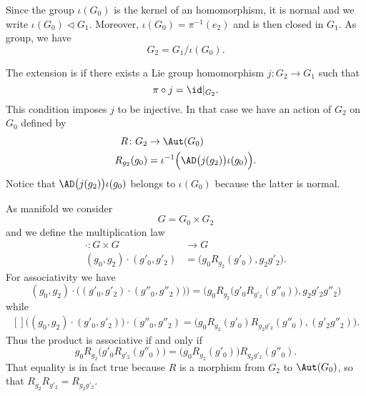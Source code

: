 Since the group $\iota(G_0)$ is the kernel of an homomorphism, it is normal and we write $\iota(G_0)\lhd G_1$. Moreover, $\iota(G_0)=\pi^{-1}(e_2)$ and is then closed in $G_1$. As group, we have
\begin{equation}
	G_2=G_1/\iota(G_0).
\end{equation}

The extension is  if there exists a Lie group homomorphism  $j\colon G_2\to G_1$ such that
\begin{equation}
	\pi\circ j=\id|_{G_2}.
\end{equation}
This condition imposes $j$ to be injective. In that case we have an action of $G_2$ on $G_0$ defined by
\begin{equation}
	\begin{aligned}
		R\colon G_2  & \to \Aut(G_0)                                           \\
		R_{g_2}(g_0) & =\iota^{-1}\Big( \AD\big( j(g_2) \big)\iota(g_0) \Big).
	\end{aligned}
\end{equation}
Notice that $\AD\big(j(g_2)\big)\iota(g_0)$ belongs to $\iota(G_0)$ because the latter is normal.

As manifold we consider
\begin{equation}
	G=G_0\times G_2
\end{equation}
and we define the multiplication law
\begin{equation}
	\begin{aligned}
		\cdot\colon G\times G     & \to G                                   \\
		(g_0,g_2)\cdot(g'_0,g'_2) & =\big( g_0 R_{g_2}(g'_0),g_2g'_2 \big).
	\end{aligned}
\end{equation}
For associativity we have
\begin{equation}
	(g_0,g_2)\cdot\big( (g'_0,g'_2)\cdot (g''_0,g''_2)) \big)=\Big(  g_0R_{g_2}\big( g'_0R_{g'_2}(g''_0) \big),g_2g'_2g''_2  \Big)
\end{equation}
while
\begin{equation}
	\begin{aligned}[]
		\big( (g_0,g_2)\cdot(g'_0,g'_2) \big)\cdot(g''_0,g''_2)=\big( g_0R_{g_2}(g'_0)R_{g_2g'_2}(g''_0),(g'_2g''_2) \big).
	\end{aligned}
\end{equation}
Thus the product is associative if and only if
\begin{equation}
	g_0R_{g_2}\big( g'_0R_{g'_2}(g''_0) \big)=\big( g_0R_{g_2}(g'_0) \big)R_{g_2g'_2}(g''_0).
\end{equation}
That equality is in fact true because $R$ is a morphism from $G_2$ to $\Aut(G_0)$, so that $R_{g_2}R_{g'_2}=R_{g_2g'_2}$.

